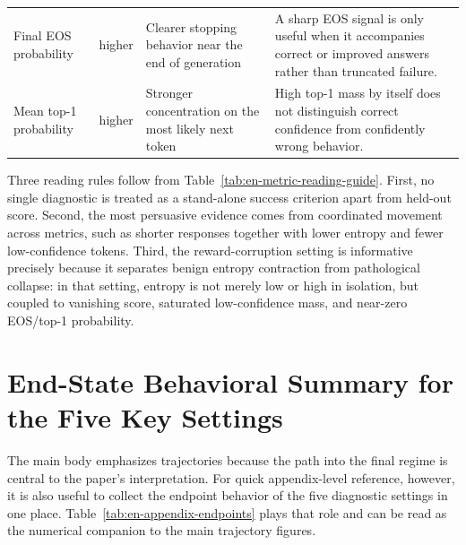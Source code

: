 \documentclass[12pt,a4paper]{ctexart}
\begin{document}
\begin{table}[H]
\begin{tabular}{>{\raggedright\arraybackslash}p{2.5cm}>{\raggedright\arraybackslash}p{2.2cm}>{\raggedright\arraybackslash}p{4.2cm}>{\raggedright\arraybackslash}p{4.4cm}}
        Final EOS probability & higher & Clearer stopping behavior near the end of generation & A sharp EOS signal is only useful when it accompanies correct or improved answers rather than truncated failure. \\
        Mean top-1 probability & higher & Stronger concentration on the most likely next token & High top-1 mass by itself does not distinguish correct confidence from confidently wrong behavior. \\
        \bottomrule
    \end{tabular}
\end{table}

Three reading rules follow from Table~\ref{tab:en-metric-reading-guide}. First, no single diagnostic is treated as a stand-alone success criterion apart from held-out score. Second, the most persuasive evidence comes from coordinated movement across metrics, such as shorter responses together with lower entropy and fewer low-confidence tokens. Third, the reward-corruption setting is informative precisely because it separates benign entropy contraction from pathological collapse: in that setting, entropy is not merely low or high in isolation, but coupled to vanishing score, saturated low-confidence mass, and near-zero EOS/top-1 probability.

\section{End-State Behavioral Summary for the Five Key Settings}

The main body emphasizes trajectories because the path into the final regime is central to the paper's interpretation. For quick appendix-level reference, however, it is also useful to collect the endpoint behavior of the five diagnostic settings in one place. Table~\ref{tab:en-appendix-endpoints} plays that role and can be read as the numerical companion to the main trajectory figures.
\end{document}
